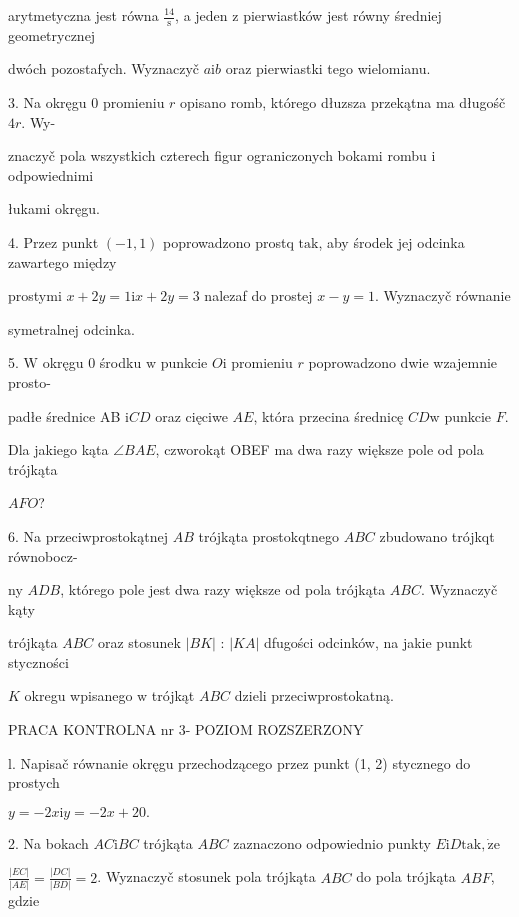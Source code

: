 \documentclass[a4paper,12pt]{article}
\begin{document}
arytmetyczna jest równa $\displaystyle \frac{14}{\mathrm{s}}$, a jeden $\mathrm{z}$ pierwiastków jest równy średniej geometrycznej

dwóch pozostafych. Wyznaczyč $a\mathrm{i}b$ oraz pierwiastki tego wielomianu.

3. Na okręgu $0$ promieniu $r$ opisano romb, którego dłuzsza przekątna ma długośč $4r$. Wy-

znaczyč pola wszystkich czterech figur ograniczonych bokami rombu $\mathrm{i}$ odpowiednimi

łukami okręgu.

4. Przez punkt $(-1,1)$ poprowadzono prostq $\mathrm{t}\mathrm{a}\mathrm{k}$, aby środek jej odcinka zawartego między

prostymi $x+2y= 1\mathrm{i}x+2y=3$ nalezaf do prostej $x-y= 1$. Wyznaczyč równanie

symetralnej odcinka.

5. $\mathrm{W}$ okręgu $0$ środku $\mathrm{w}$ punkcie $O\mathrm{i}$ promieniu $r$ poprowadzono dwie wzajemnie prosto-

padłe średnice AB $\mathrm{i}CD$ oraz cięciwe $AE$, która przecina średnicę $CD\mathrm{w}$ punkcie $F.$

Dla jakiego kąta $\angle BAE$, czworokąt OBEF ma dwa razy większe pole od pola trójkąta

$AFO$?

6. Na przeciwprostokątnej $AB$ trójkąta prostokqtnego $ABC$ zbudowano trójkqt równobocz-

ny $ADB$, którego pole jest dwa razy większe od pola trójkąta $ABC$. Wyznaczyč kąty

trójkąta $ABC$ oraz stosunek $|BK|$ : $|KA|$ dfugości odcinków, na jakie punkt styczności

$K$ okregu wpisanego $\mathrm{w}$ trójkąt $ABC$ dzieli przeciwprostokatną.





PRACA KONTROLNA nr 3- POZIOM ROZSZERZONY

l. Napisač równanie okręgu przechodzącego przez punkt (1, 2) stycznego do prostych

$y=-2x\mathrm{i}y=-2x+20.$

2. Na bokach $AC \mathrm{i} BC$ trójkąta $ABC$ zaznaczono odpowiednio punkty $E \mathrm{i} D \mathrm{t}\mathrm{a}\mathrm{k}, \dot{\mathrm{z}}\mathrm{e}$

$\displaystyle \frac{|EC|}{|AE|}=\frac{|DC|}{|BD|}=2$. Wyznaczyč stosunek pola trójkąta $ABC$ do pola trójkąta $ABF$, gdzie
\end{document}

